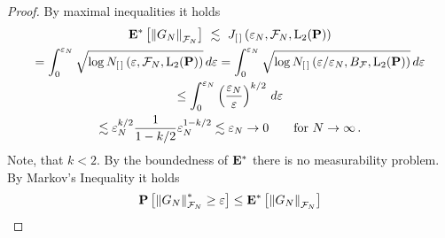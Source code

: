 \begin{proof}
  By maximal inequalities it holds
  \begin{gather}
    \E^*
    \left[ 
      \norm{G_N}_{\mathcal{F}_N}
    \right]
      \ 
      \lesssim
      \ 
      J_{[\,]}\left( \varepsilon_N, \mathcal{F}_N,\mathrm{L}_2(\P) \right)
      \\
      =
      \int_0^{\varepsilon_N}
      \sqrt{\log 
      N_{[\,]}
\left( \varepsilon, \mathcal{F}_N,\mathrm{L}_2(\P) \right)
    }
    \,
    d\varepsilon
    =
      \int_0^{\varepsilon_N}
      \sqrt{\log 
      N_{[\,]}
\left( \varepsilon/\varepsilon_N, B_\mathcal{F},\mathrm{L}_2(\P) \right)
    }
    \,
    d\varepsilon
    \\
    \le
      \int_0^{\varepsilon_N}
      \left( 
      \frac{\varepsilon_N}{\varepsilon}
    \right)^{k/2}
    \,
    d\varepsilon
    \\
    \lesssim
  \varepsilon_N^{k/2}
  \frac{1}{1-k/2}
  \varepsilon_N^{1-k/2}
  \lesssim
  \varepsilon_N
  \to
  0
  \qquad
  \text{for}\ 
  N\to
  \infty
  \,.
  \end{gather}
  Note, that $k<2$.
  By the boundedness of $\mathbf{E}^*$ there is no measurability problem.
  By Markov's Inequality it holds
  \begin{align}
    \mathbf{P}
    \left[ 
      \left\lVert G_N\right\rVert^*_{\mathcal{F}_N}\ge \varepsilon
    \right]
    \le
    \mathbf{E}^*
    \left[ 
      \left\lVert G_N\right\rVert_{\mathcal{F}_N}
    \right]
  \end{align}
\end{proof}
